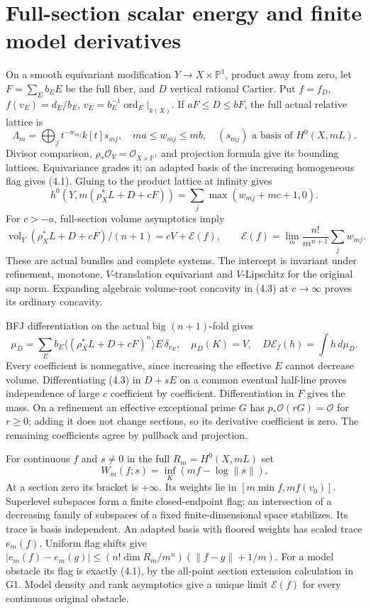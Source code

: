\documentclass[10pt]{article}
\newcommand{\vol}{\operatorname{vol}}
\newcommand{\OO}{\mathcal O}
\begin{document}
\section{Full-section scalar energy and finite model derivatives}
On a smooth equivariant modification $Y\to X\times\mathbb P^1$,
product away from zero, let $F=\sum_E b_EE$ be the full fiber, and
$D$ vertical rational Cartier. Put $f=f_D$, $f(v_E)=d_E/b_E$,
$v_E=b_E^{-1}\operatorname{ord}_E|_{k(X)}$.
If $aF\leq D\leq bF$, the full actual relative lattice is
\[
 \Lambda_m=\bigoplus_jt^{-w_{mj}}k[t]s_{mj},\quad
 ma\leq w_{mj}\leq mb,\quad (s_{mj})\text{ a basis of }H^0(X,mL).
 \tag{4.1}
\]
Divisor comparison, $\rho_*\OO_Y=\OO_{X\times\mathbb P^1}$ and
projection formula give its bounding lattices. Equivariance grades it;
an adapted basis of the increasing homogeneous flag gives (4.1).
Gluing to the product lattice at infinity gives
\[
 h^0(Y,m(\rho_X^*L+D+cF))
       =\sum_j\max(w_{mj}+mc+1,0).
 \tag{4.2}
\]
For $c>-a$, full-section volume asymptotics imply
\[
 \vol_Y(\rho_X^*L+D+cF)/(n+1)=cV+\mathscr E(f),\qquad
 \mathscr E(f)=\lim_m\frac{n!}{m^{n+1}}\sum_j w_{mj}.
 \tag{4.3}
\]
These are actual bundles and complete systems. The intercept is invariant
under refinement, monotone, $V$-translation equivariant and $V$-Lipschitz
for the original sup norm. Expanding algebraic volume-root concavity in
(4.3) at $c\to\infty$ proves its ordinary concavity.

BFJ differentiation on the actual big $(n+1)$-fold gives
\[
 \mu_D=\sum_E b_E\langle(\rho_X^*L+D+cF)^n\rangle E\,\delta_{v_E},
 \quad\mu_D(K)=V,\quad D\mathscr E_f(h)=\int h\,d\mu_D.
 \tag{4.4}
\]
Every coefficient is nonnegative, since increasing the effective $E$
cannot decrease volume. Differentiating (4.3) in $D+sE$ on a common
eventual half-line proves independence of large $c$ coefficient by
coefficient. Differentiation in $F$ gives the mass. On a refinement an
effective exceptional prime $G$ has $p_*\OO(rG)=\OO$ for $r\geq0$;
adding it does not change sections, so its derivative coefficient is zero.
The remaining coefficients agree by pullback and projection.

For continuous $f$ and $s\ne0$ in the full $R_m=H^0(X,mL)$ set
\[
 W_m(f;s)=\inf_K(mf-\log\|s\|).
 \tag{4.5}
\]
At a section zero its bracket is $+\infty$. Its weights lie in
$[m\min f,mf(v_0)]$. Superlevel subspaces form a finite closed-endpoint
flag: an intersection of a decreasing family of subspaces of a fixed
finite-dimensional space stabilizes. Its trace is basis independent.
An adapted basis with floored weights has scaled trace $e_m(f)$.
Uniform flag shifts give
$|e_m(f)-e_m(g)|\leq(n!\dim R_m/m^n)(\|f-g\|+1/m)$.
For a model obstacle its flag is exactly (4.1), by the all-point section
extension calculation in G1. Model density and rank asymptotics give a
unique limit $\mathscr E(f)$ for every continuous original obstacle.
\end{document}
